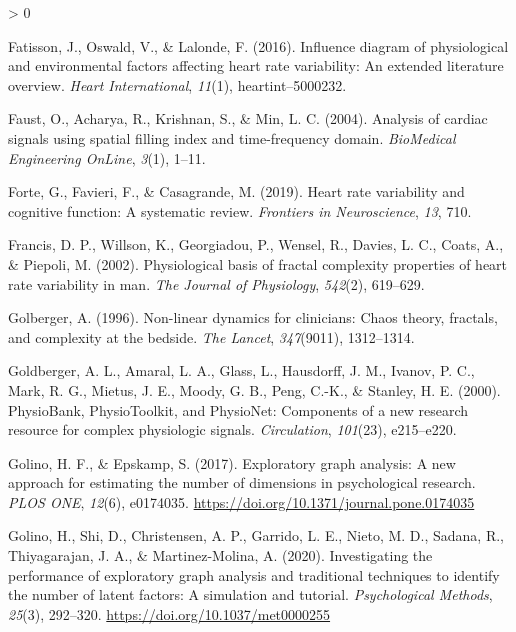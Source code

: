 \documentclass[
  english,
  jou,floatsintext]{apa6}
\newlength{\cslhangindent}
\newenvironment{CSLReferences}[2] %
 {%
  \setlength{\parindent}{0pt}
  \ifodd #1 \everypar{\setlength{\hangindent}{\cslhangindent}}\ignorespaces\fi
  \ifnum #2 > 0
  \setlength{\parskip}{#2\baselineskip}
  \fi
 }%
 {}
\begin{document}
\begin{CSLReferences}{1}{0}
\leavevmode\hypertarget{ref-fatisson2016influence}{}%
Fatisson, J., Oswald, V., \& Lalonde, F. (2016). Influence diagram of physiological and environmental factors affecting heart rate variability: An extended literature overview. \emph{Heart International}, \emph{11}(1), heartint--5000232.

\leavevmode\hypertarget{ref-faust2004analysis}{}%
Faust, O., Acharya, R., Krishnan, S., \& Min, L. C. (2004). Analysis of cardiac signals using spatial filling index and time-frequency domain. \emph{BioMedical Engineering OnLine}, \emph{3}(1), 1--11.

\leavevmode\hypertarget{ref-forte2019heart}{}%
Forte, G., Favieri, F., \& Casagrande, M. (2019). Heart rate variability and cognitive function: A systematic review. \emph{Frontiers in Neuroscience}, \emph{13}, 710.

\leavevmode\hypertarget{ref-francis2002physiological}{}%
Francis, D. P., Willson, K., Georgiadou, P., Wensel, R., Davies, L. C., Coats, A., \& Piepoli, M. (2002). Physiological basis of fractal complexity properties of heart rate variability in man. \emph{The Journal of Physiology}, \emph{542}(2), 619--629.

\leavevmode\hypertarget{ref-golberger1996non}{}%
Golberger, A. (1996). Non-linear dynamics for clinicians: Chaos theory, fractals, and complexity at the bedside. \emph{The Lancet}, \emph{347}(9011), 1312--1314.

\leavevmode\hypertarget{ref-goldberger2000physiobank}{}%
Goldberger, A. L., Amaral, L. A., Glass, L., Hausdorff, J. M., Ivanov, P. C., Mark, R. G., Mietus, J. E., Moody, G. B., Peng, C.-K., \& Stanley, H. E. (2000). PhysioBank, PhysioToolkit, and PhysioNet: Components of a new research resource for complex physiologic signals. \emph{Circulation}, \emph{101}(23), e215--e220.

\leavevmode\hypertarget{ref-Golino_2017}{}%
Golino, H. F., \& Epskamp, S. (2017). Exploratory graph analysis: A new approach for estimating the number of dimensions in psychological research. \emph{{PLOS} {ONE}}, \emph{12}(6), e0174035. \url{https://doi.org/10.1371/journal.pone.0174035}

\leavevmode\hypertarget{ref-Golino_2020}{}%
Golino, H., Shi, D., Christensen, A. P., Garrido, L. E., Nieto, M. D., Sadana, R., Thiyagarajan, J. A., \& Martinez-Molina, A. (2020). Investigating the performance of exploratory graph analysis and traditional techniques to identify the number of latent factors: A simulation and tutorial. \emph{Psychological Methods}, \emph{25}(3), 292--320. \url{https://doi.org/10.1037/met0000255}


\end{CSLReferences}
\end{document}
